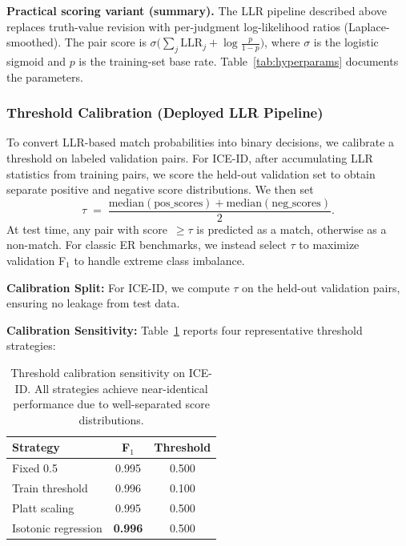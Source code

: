 \documentclass{article}
\begin{document}
\textbf{Practical scoring variant (summary).} The LLR pipeline described above replaces truth-value revision with per-judgment log-likelihood ratios (Laplace-smoothed). The pair score is $\sigma\!\bigl(\sum_j \mathrm{LLR}_j + \log\tfrac{p}{1-p}\bigr)$, where $\sigma$ is the logistic sigmoid and $p$ is the training-set base rate. Table~\ref{tab:hyperparams} documents the parameters.

\subsubsection{Threshold Calibration (Deployed LLR Pipeline)}
\label{subsec:threshold_calibration}

To convert LLR-based match probabilities into binary decisions, we calibrate a threshold on labeled validation pairs. For ICE-ID, after accumulating LLR statistics from training pairs, we score the held-out validation set to obtain separate positive and negative score distributions. We then set
\[
  \tau \;=\; \frac{\mathrm{median}(\text{pos\_scores}) + \mathrm{median}(\text{neg\_scores})}{2}.
\]
At test time, any pair with score~$\ge\tau$ is predicted as a match, otherwise as a non-match. For classic ER benchmarks, we instead select $\tau$ to maximize validation F$_1$ to handle extreme class imbalance.

\textbf{Calibration Split:} For ICE-ID, we compute $\tau$ on the held-out validation pairs, ensuring no leakage from test data.

\textbf{Calibration Sensitivity:} Table~\ref{tab:calibration_sensitivity} reports four representative threshold strategies:

\begin{table}[H]
  \centering
  \small
  \caption{Threshold calibration sensitivity on ICE-ID. All strategies achieve near-identical performance due to well-separated score distributions.}
  \label{tab:calibration_sensitivity}
  \begin{tabular}{lcc}
    \toprule
    \textbf{Strategy} & \textbf{F$_1$} & \textbf{Threshold} \\
    \midrule
    Fixed 0.5 & 0.995 & 0.500 \\
    Train threshold & 0.996 & 0.100 \\
    Platt scaling & 0.995 & 0.500 \\
    Isotonic regression & \textbf{0.996} & 0.500 \\
    \bottomrule
  \end{tabular}
\end{table}
\end{document}
